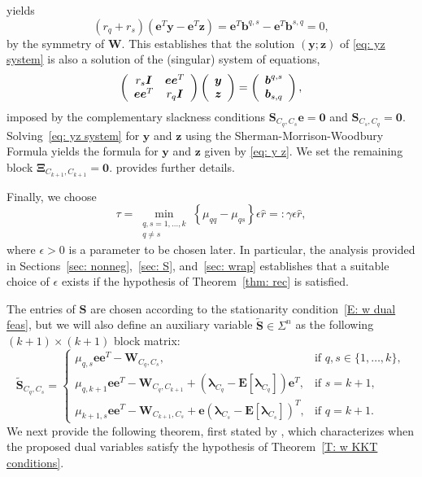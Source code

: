 \documentclass[twoside,11pt]{article}
\renewcommand{\S}{\mathbf{S}}
\newcommand{\E}{\mathbf{E}}
\newcommand{\St}{\bs{\tilde S}}
\renewcommand{\b}{{\bs{b}}}
\newcommand{\e}{\bs {e}}
\newcommand{\bs}{\boldsymbol}
\newcommand{\y}{\bs {y}}
\newcommand{\W}{\bs {W}}
\newcommand{\z}{\bs{z}}
\newcommand{\0}{\bs{0}}
\newcommand{\vect}[1] {\ensuremath{\left(\begin{array}{c} #1 \end{array} \right)}} %
\newcommand{\mat}[1] {\ensuremath{ \left(\begin{array} #1 \end{array} \right)}} %
\newcommand{\branchdef}[1] {\ensuremath{ \left\{\begin{array}{rl} #1 \end{array} \right. }} %
\newcommand{\bra}[1]{\ensuremath{\left\{ #1 \right\}}} %
\newcommand{\eq}[1]{\(#1\)}
\begin{document}
{yields
\[
	(r_q + r_s)( \e^T \y -  \e^T \z) = \e^T \b^{q,s} - \e^T \b^{s,q}
	= 0,
\]
by the symmetry of \eq{\W}. This establishes that the solution
\((\y; \z)\) of \eqref{eq: yz system}
is also a solution of the (singular) system of equations,
\[
	\mat{{cc} r_s \I & \e\e^T  \\ \e\e^T & r_q \I }
	\vect{ \y \\ \z } = \vect{\b^{q,s} \\ \b_{s,q} },
\]
imposed by the complementary slackness conditions
${\S_{C_q, C_s} \e = \0}$ and ${\S_{C_s, C_q} = \0 }$.
Solving~\eqref{eq: yz system} for ${\y}$ and $\z$
using the Sherman-Morrison-Woodbury
Formula
yields the formula for $\y$ and $\z$ given by
\eqref{eq: y z}.
We set the remaining block $\bs\Xi_{C_{k+1}, C_{k+1} } = \0$.
\citet[Section~4.2]{ames2014guaranteed} provides further details.

Finally, we choose
\begin{equation} \label{eq: mu}
\tau = \min_{\substack{q,s=1,\dots, k \\ q \neq s }} \bra{\mu_{qq} - \mu_{qs}} \epsilon  \hat r =: \gamma\epsilon  \hat r,
\end{equation}
where \(\epsilon > 0\) is a parameter to be chosen later.
In particular, the analysis provided in Sections~\ref{sec: nonneg},~\ref{sec: S}, and~\ref{sec: wrap} establishes that
a suitable choice of $\epsilon$ exists if the hypothesis of
Theorem~\ref{thm: rec} is satisfied.

The entries of \(\S\) are chosen according to the stationarity condition~\eqref{E: w dual feas}, but we will also define
an auxiliary variable \(\St \in \Sigma^n\) as the following \((k+1)\times (k+1)\) block matrix:
\begin{equation} \label{e: tilde S def}
\St_{C_q, C_s} = \branchdef{
	\mu_{q,s}\e\e^T - \W_{C_q, C_s},  & \mbox{if } q, s \in \{1,\dots, k\}, \\
	\mu_{q,k+1} \e\e^T - \W_{C_q, C_{k+1}} + (\bs\lambda_{C_q} - \E[\bs\lambda_{C_q}] )\e^T ,  & \mbox{if } s = {k+1},  \\
	\mu_{k+1,s} \e\e^T - \W_{C_{k+1}, C_s} + \e (\bs \lambda_{C_s} - \E[\bs\lambda_{C_s}] )^T,   & \mbox{if } q = {k+1} .
}
\end{equation}
We next provide the following theorem, first stated by \citet[Theorem~4.2]{ames2014guaranteed},
which characterizes when the proposed dual variables satisfy the hypothesis
of Theorem~\ref{T:  w KKT conditions}.

}
\end{document}
